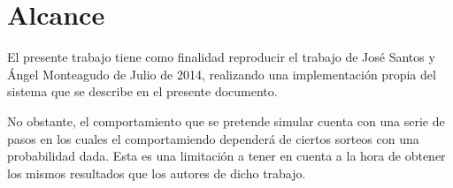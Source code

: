   \section{Alcance}

  	El presente trabajo tiene como finalidad reproducir el trabajo de José Santos y Ángel Monteagudo de Julio de 2014, realizando
  	una implementación propia del sistema que se describe en el presente documento.

  	No obstante, el comportamiento que se pretende simular cuenta con una serie de pasos en los cuales el comportamiendo dependerá
  	de ciertos sorteos con una probabilidad dada. Esta es una limitación a tener en cuenta a la hora de obtener los mismos resultados
  	que los autores de dicho trabajo.
